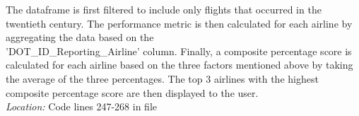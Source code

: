 \noindent The dataframe is first filtered to include only flights that occurred in the twentieth century. The performance metric is then calculated for each airline by aggregating the data based on the\\ 'DOT\_ID\_Reporting\_Airline' column. Finally, a composite percentage score is calculated for each airline based on the three factors mentioned above by taking the average of the three percentages. The top 3 airlines with the highest composite percentage score are then displayed to the user.\\

\noindent \textit{Location:} Code lines 247-268 in file 
